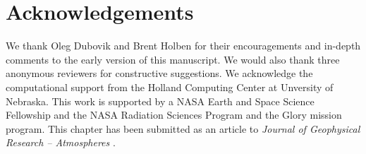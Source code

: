 \section{Acknowledgements}

We thank Oleg Dubovik and Brent Holben for their encouragements and
in-depth comments to the early version of this manuscript. We would also
thank three anonymous reviewers for constructive suggestions. 
We acknowledge the computational 
support from the Holland Computing Center at Unversity of Nebraska.
This work is supported by a NASA Earth and Space Science
Fellowship and the NASA Radiation Sciences Program and the Glory mission
program. This chapter has been submitted as an article to
\textit{Journal of Geophysical Research – Atmospheres} \citep{Xu15a}.
